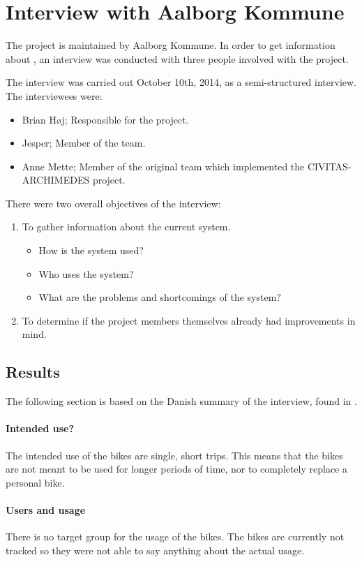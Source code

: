 \section{Interview with Aalborg Kommune}
The \citybike project is maintained by Aalborg Kommune.
In order to get information about \citybike, an interview was conducted with three people involved with the project.

The interview was carried out October 10th, 2014, as a semi-structured interview.
The interviewees were:
\begin{itemize}
\item Brian Høj; Responsible for the \citybike project.
\item Jesper; Member of the \citybike team.
\item Anne Mette; Member of the original team which implemented the CIVITAS-ARCHIMEDES project\cite{aalborgbycyklenbagcyklen}.
\end{itemize}

\noindent There were two overall objectives of the interview:
\begin{enumerate}
\item To gather information about the current system.
\begin{itemize}
\item How is the system used?
\item Who uses the system?
\item What are the problems and shortcomings of the system?
\end{itemize}
\item To determine if the project members themselves already had improvements in mind.
\end{enumerate}

\subsection{Results} \label{interview:goals}
The following section is based on the Danish summary of the interview, found in .

\paragraph{Intended use?}
The intended use of the bikes are single, short trips.
This means that the bikes are not meant to be used for longer periods of time, nor to completely replace a personal bike.

\paragraph{Users and usage}
There is no target group for the usage of the bikes.
The bikes are currently not tracked so they were not able to say anything about the actual usage.

